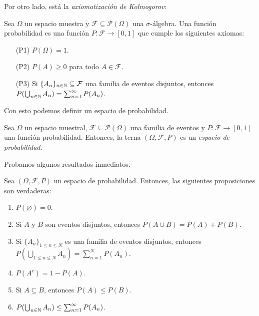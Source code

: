Por otro lado, está la \textit{axiomatización de Kolmogorov}:

\begin{definition}
    Sea $\Omega$ un espacio muestra y $\mathcal{F} \subseteq \mathcal{P}(\Omega)$ una $\sigma$-álgebra. Una función probabilidad es una función $P: \mathcal{F} \to [0, 1]$ que cumple los siguientes axiomas:
    \begin{itemize}
        \item[(P1)] $P(\Omega) = 1$.
        \item[(P2)] $P(A) \geq 0$ para todo $A \in \mathcal{F}$.
        \item[(P3)] Si $\{A_n\}_{n \in \mathbb{N}} \subseteq \mathcal{F}$ una familia de eventos disjuntos, entonces $P(\bigcup_{n \in \mathbb{N}} A_n) = \sum_{n = 1}^{\infty} P(A_n)$.
    \end{itemize}
\end{definition}

Con esto podemos definir un espacio de probabilidad.

\begin{definition}
    Sea $\Omega$ un espacio muestral, $\mathcal{F} \subseteq \mathcal{P}(\Omega)$ una familia de eventos y $P: \mathcal{F} \to [0, 1]$ una función probabilidad. Entonces, la terna $(\Omega, \mathcal{F}, P)$ es un \emph{espacio de probabilidad}.
\end{definition}

%
%

Probamos algunos resultados inmediatos.

\begin{proposition}
    Sea $(\Omega, \mathcal{F}, P)$ un espacio de probabilidad. Entonces, las siguientes proposiciones son verdaderas:
    \begin{enumerate}
        \item $P(\varnothing) = 0$.
        \item Si $A$ y $B$ son eventos disjuntos, entonces $P(A \cup B) = P(A) + P(B)$.
        \item Si $\{A_n\}_{1 \leq n \leq N}$ es una familia de eventos disjuntos, entonces $P(\bigcup_{1 \leq n \leq N} A_n) = \sum_{n = 1}^N P(A_n)$.
        \item $P(A^{\textrm{c}}) = 1 - P(A)$.
        \item Si $A \subseteq B$, entonces $P(A) \leq P(B)$.
        \item $P(\bigcup_{n \in \mathbb{N}} A_n) \leq \sum_{n = 1}^{\infty} P(A_n)$.
    \end{enumerate}
\end{proposition}

